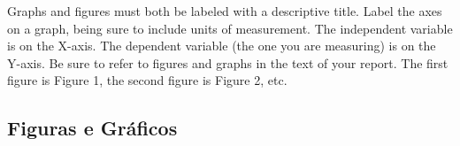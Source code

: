 

Graphs and figures must both be labeled with a descriptive title. Label the axes on a graph, being sure to include units of measurement. The independent variable is on the X-axis. The dependent variable (the one you are measuring) is on the Y-axis. Be sure to refer to figures and graphs in the text of your report. The first figure is Figure 1, the second figure is Figure 2, etc.


\subsection{Figuras e Gráficos}
\label{figuras}
